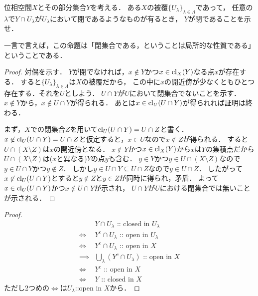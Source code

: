 \documentclass{jsarticle}
\begin{document}
    \begin{Prop}
        位相空間$X$とその部分集合$Y$を考える．
        ある$X$の被覆$\{ U_{\lambda} \}_{\lambda \in \Lambda}$であって，
        任意の$\lambda$で$Y \cap U_{\lambda}$が$U_{\lambda}$において閉であるようなものが有るとき，
        $Y$が閉であることを示せ．
    \end{Prop}
    一言で言えば，この命題は「閉集合である，ということは局所的な性質である」ということである．

    \begin{proof}
    対偶を示す．
    $Y$が閉でなければ，$x \not \in Y$かつ$x \in \operatorname{cl}_{X}(Y)$なる点$x$が存在する．
    すると$\{ U_{\lambda} \}_{\lambda \in \Lambda}$は$X$の被覆だから，
    この中に$x$の開近傍が少なくともひとつ存在する．それを$U$としよう．
    $U \cap Y$が$U$において閉集合でないことを示す．
    $x \not \in Y$から，$x \not \in U \cap Y$が得られる．
    あとは$x \in \operatorname{cl}_{U}(U \cap Y)$が得られれば証明は終わる．

    まず，$X$での閉集合$Z$を用いて$\operatorname{cl}_{U}(U \cap Y)=U \cap Z$と書く．
    $x \not \in \operatorname{cl}_{U}(U \cap Y)=U \cap Z$と仮定すると，$x \in U$なので$x \not \in Z$が得られる．
    すると$U \cap (X \setminus Z)$は$x$の開近傍となる．
    $x \not \in Y$かつ$x \in \operatorname{cl}_{X}(Y)$から$x$は$Y$の集積点だから$U \cap (X \setminus Z)$は($x$と異なる)$Y$の点$y$も含む．
    $y \in Y$かつ$y \in U \cap (X \setminus Z)$なので$y \in U \cap Y$かつ$y \not \in Z$．
    しかし$y \in U \cap Y \subseteq U \cap Z$なので$y \in U \cap Z$．
    したがって$x \not \in \operatorname{cl}_{U}(U \cap Y)$とすると$y \not \in Z$と$y \in Z$が同時に得られ，矛盾．
    よって$x \in \operatorname{cl}_{U}(U \cap Y)$かつ$x \not \in U \cap Y$が示され，
    $U \cap Y$が$U$における閉集合では無いことが示される．
    \end{proof}
    \begin{proof}
        \begin{align*}
            {}&         Y \cap U_{\lambda} \text{ :: closed in } U_{\lambda} \\
            \iff&       Y^c \cap U_{\lambda} \text{ :: open in } U_{\lambda} \\ 
            \iff&       Y^c \cap U_{\lambda} \text{ :: open in } X \\ 
            \implies&   {\textstyle \bigcup_{\lambda}{(Y^c \cap U_{\lambda})}} \text{ :: open in } X \\ 
            \iff&       Y^c \text{ :: open in } X \\ 
            \iff&       Y \text{ :: closed in } X
        \end{align*}
        ただし2つめの$\iff$は$U_{\lambda}$::open in $X$から．
    \end{proof}
\end{document}
